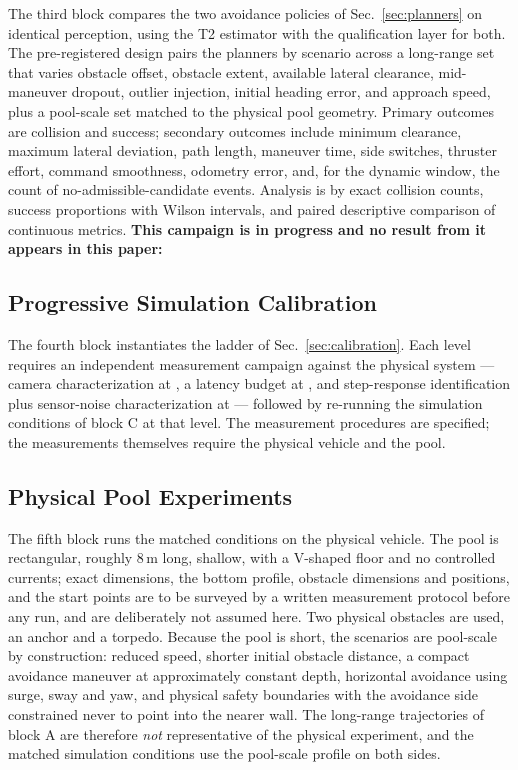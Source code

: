 The third block compares the two avoidance policies of
Sec.~\ref{sec:planners} on identical perception, using the T2 estimator with
the qualification layer for both. The pre-registered design pairs the
planners by scenario across a long-range set that varies obstacle offset,
obstacle extent, available lateral clearance, mid-maneuver dropout, outlier
injection, initial heading error, and approach speed, plus a pool-scale set
matched to the physical pool geometry. Primary outcomes are collision and
success; secondary outcomes include minimum clearance, maximum lateral
deviation, path length, maneuver time, side switches, thruster effort,
command smoothness, odometry error, and, for the dynamic window, the count of
no-admissible-candidate events. Analysis is by exact collision counts,
success proportions with Wilson intervals, and paired descriptive comparison
of continuous metrics. \textbf{This campaign is in progress and no result
from it appears in this paper:} \PEIGHT

\subsection{Progressive Simulation Calibration}

The fourth block instantiates the ladder of Sec.~\ref{sec:calibration}. Each
level requires an independent measurement campaign against the physical
system --- camera characterization at \SONE{}, a latency budget at \STWO{},
and step-response identification plus sensor-noise characterization at
\STHREE{} --- followed by re-running the simulation conditions of block C at
that level. The measurement procedures are specified; the measurements
themselves require the physical vehicle and the pool. \CALIB

\subsection{Physical Pool Experiments}

The fifth block runs the matched conditions on the physical vehicle. The
pool is rectangular, roughly 8\,m long, shallow, with a V-shaped floor and no
controlled currents; exact dimensions, the bottom profile, obstacle
dimensions and positions, and the start points are to be surveyed by a
written measurement protocol before any run, and are deliberately not
assumed here. Two physical obstacles are used, an anchor and a torpedo.
Because the pool is short, the scenarios are pool-scale by construction:
reduced speed, shorter initial obstacle distance, a compact avoidance
maneuver at approximately constant depth, horizontal avoidance using surge,
sway and yaw, and physical safety boundaries with the avoidance side
constrained never to point into the nearer wall. The long-range trajectories
of block A are therefore \emph{not} representative of the physical
experiment, and the matched simulation conditions use the pool-scale profile
on both sides.


